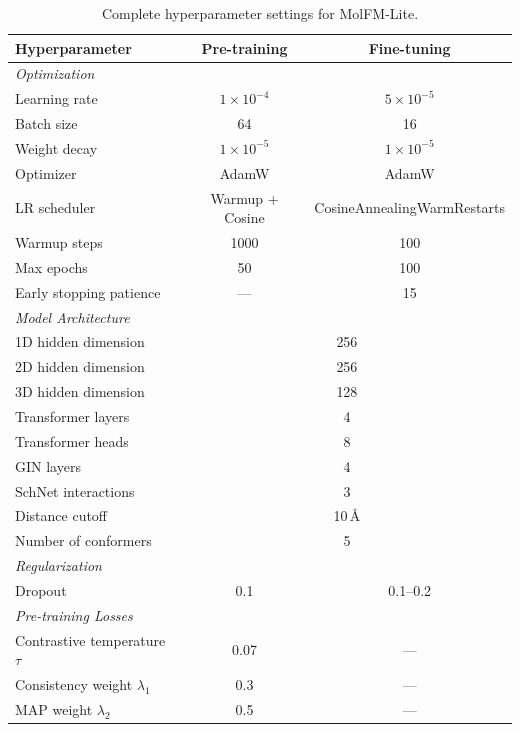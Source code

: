 \documentclass[11pt]{article}
\newcommand{\modelname}{MolFM-Lite}
\begin{document}
\begin{table}[h]
    \centering
    \caption{Complete hyperparameter settings for \modelname{}.}
    \begin{tabular}{lcc}
        \toprule
        \textbf{Hyperparameter} & \textbf{Pre-training} & \textbf{Fine-tuning} \\
        \midrule
        \multicolumn{3}{l}{\textit{Optimization}} \\
        Learning rate & $1 \times 10^{-4}$ & $5 \times 10^{-5}$ \\
        Batch size & 64 & 16 \\
        Weight decay & $1 \times 10^{-5}$ & $1 \times 10^{-5}$ \\
        Optimizer & AdamW & AdamW \\
        LR scheduler & Warmup + Cosine & CosineAnnealingWarmRestarts \\
        Warmup steps & 1000 & 100 \\
        Max epochs & 50 & 100 \\
        Early stopping patience & --- & 15 \\
        \midrule
        \multicolumn{3}{l}{\textit{Model Architecture}} \\
        1D hidden dimension & \multicolumn{2}{c}{256} \\
        2D hidden dimension & \multicolumn{2}{c}{256} \\
        3D hidden dimension & \multicolumn{2}{c}{128} \\
        Transformer layers & \multicolumn{2}{c}{4} \\
        Transformer heads & \multicolumn{2}{c}{8} \\
        GIN layers & \multicolumn{2}{c}{4} \\
        SchNet interactions & \multicolumn{2}{c}{3} \\
        Distance cutoff & \multicolumn{2}{c}{10\,\AA} \\
        Number of conformers & \multicolumn{2}{c}{5} \\
        \midrule
        \multicolumn{3}{l}{\textit{Regularization}} \\
        Dropout & 0.1 & 0.1--0.2 \\
        \midrule
        \multicolumn{3}{l}{\textit{Pre-training Losses}} \\
        Contrastive temperature $\tau$ & 0.07 & --- \\
        Consistency weight $\lambda_1$ & 0.3 & --- \\
        MAP weight $\lambda_2$ & 0.5 & --- \\
        \bottomrule
    \end{tabular}
\end{table}
\end{document}
